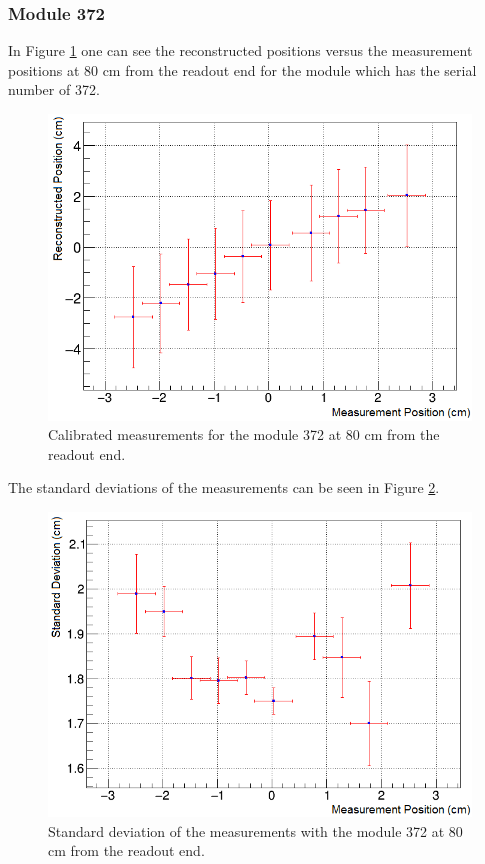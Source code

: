 \documentclass[a4paper]{article}\linespread{1.4}
\begin{document}
\subsubsection{Module 372} 
In Figure \ref{fig:72m} one can see the reconstructed positions versus the measurement positions at 80 cm from the readout end for the module which has the serial number of 372.
\begin{figure}[h!] \hspace*{-0cm} \includegraphics[width=120mm,scale=2.0]{72m.png} \caption{Calibrated measurements for the module 372 at 80 cm from the readout end.}  \label{fig:72m}\end{figure}
The standard deviations of the measurements can be seen in Figure \ref{fig:72s}.
\begin{figure}[h!] \hspace*{-0cm} \includegraphics[width=120mm,scale=2.0]{72s.png} \caption{Standard deviation of the measurements with the module 372 at 80 cm from the readout end.}  \label{fig:72s}\end{figure}
\end{document}
